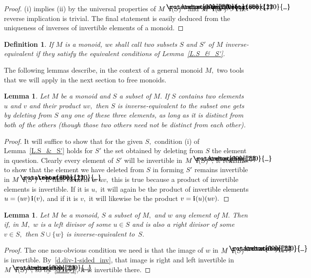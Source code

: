 \documentclass{amsart}
\newtheorem{lemma}[equation]{Lemma}
\newtheorem{definition}[equation]{Definition}
\numberwithin{equation}{section}
\newcommand{\I}{\mathbf{i}\hspace{.05em}}
\newcommand{\langl}{\begin{picture}(.51em,1em)
\put(.11em,.33em){\rotatebox{60}{\line(1,0){.55em}}}
\put(.11em,.33em){\rotatebox{300}{\line(1,0){.55em}}}
\end{picture}}
\newcommand{\rangl}{\begin{picture}(.5em,1em)
\put(.09em,.33em){\rotatebox{120}{\line(1,0){.55em}}}
\put(.09em,.33em){\rotatebox{240}{\line(1,0){.55em}}}
\end{picture}}
\begin{document}
\begin{proof}
(i) implies (ii) by the universal properties
of $M\langl\I(S)\rangl$ and $M\langl\I(S')\rangl.$
The reverse implication is trivial.
The final statement is easily deduced from the uniqueness
of inverses of invertible elements of a monoid.
\end{proof}

\begin{definition}\label{D.inv-eq}
If $M$ is a monoid, we shall call two subsets $S$
and $S'$ of $M$ {\em inverse-equivalent} if they satisfy the equivalent
conditions of Lemma~\ref{L.S_&_S'}.
\end{definition}

The following lemmas describe, in the context of a general monoid $M,$
two tools that we will apply in the next section to free monoids.

\begin{lemma}\label{L.delete_one}
Let $M$ be a monoid and $S$ a subset of $M.$
If $S$ contains two elements $u$ and $v$ and
their product $uv,$ then $S$ is inverse-equivalent to the
subset one gets by deleting from $S$ any {\em one} of these
three elements, as long as it is distinct from both of the others
{\rm(}though those two others
need not be distinct from each other{\rm)}.
\end{lemma}

\begin{proof}
It will suffice to show that for the given $S,$ condition (i) of
Lemma~\ref{L.S_&_S'}
holds for $S'$ the set obtained by deleting from $S$ the
element in question.
Clearly every element of $S'$ will be invertible
in $M\langl\I(S)\rangl;$ it remains to show that the
element we have deleted from $S$ in forming $S'$ remains
invertible in $M\langl\I(S')\rangl.$
If that element is $uv,$ this is true because a product of
invertible elements is invertible.
If it is $u,$ it will again be the product of
invertible elements $u = (uv)\,\I(v),$
and if it is $v,$ it will likewise be the product $v =\I(u)(uv).$
\end{proof}

\begin{lemma}\label{L.left-div_rt-div}
Let $M$ be a monoid, $S$ a subset of $M,$ and $w$ any element of $M.$
Then if, in $M,$ $w$ is a left divisor of some $u\in S$ and
is also a right divisor of some $v\in S,$ then $S\cup{\{w\}}$
is inverse-equivalent to~$S.$
\end{lemma}

\begin{proof}
The one non-obvious condition we need is that the image of $w$
in $M\langl\I(S)\rangl$ is invertible.
By~\eqref{d.div-1-sided_inv}, that image is right and left invertible
in $M\langl\I(S)\rangl,$ so by~\eqref{d.rt+l}, it is invertible there.
\end{proof}
\end{document}
